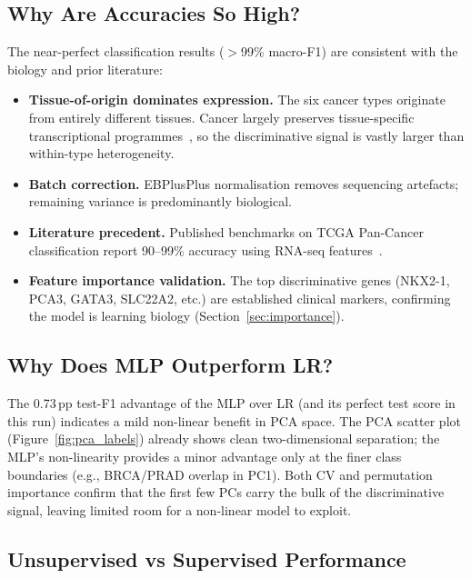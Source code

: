 \documentclass[11pt,letterpaper]{article}
\begin{document}
\subsection{Why Are Accuracies So High?}

The near-perfect classification results ($>$99\% macro-F1) are consistent with
the biology and prior literature:

\begin{itemize}[leftmargin=2em,itemsep=2pt]
  \item \textbf{Tissue-of-origin dominates expression.}  The six cancer types
        originate from entirely different tissues.  Cancer largely preserves
        tissue-specific transcriptional programmes~\cite{weinstein2013}, so the
        discriminative signal is vastly larger than within-type heterogeneity.
  \item \textbf{Batch correction.}  EBPlusPlus normalisation removes
        sequencing artefacts; remaining variance is predominantly biological.
  \item \textbf{Literature precedent.}  Published benchmarks on TCGA Pan-Cancer
        classification report 90--99\% accuracy using RNA-seq
        features~\cite{weinstein2013,hutter2018}.
  \item \textbf{Feature importance validation.}  The top discriminative genes
        (NKX2-1, PCA3, GATA3, SLC22A2, etc.) are established clinical markers,
        confirming the model is learning biology (Section~\ref{sec:importance}).
\end{itemize}

\subsection{Why Does MLP Outperform LR?}

The 0.73\,pp test-F1 advantage of the MLP over LR (and its perfect test score
in this run) indicates a mild non-linear benefit in PCA space.  The PCA scatter
plot (Figure~\ref{fig:pca_labels}) already shows clean two-dimensional
separation; the MLP's non-linearity provides a minor advantage only at the
finer class boundaries (e.g., BRCA/PRAD overlap in PC1).  Both CV and
permutation importance confirm that the first few PCs carry the bulk of the
discriminative signal, leaving limited room for a non-linear model to exploit.

\subsection{Unsupervised vs Supervised Performance}
\end{document}
